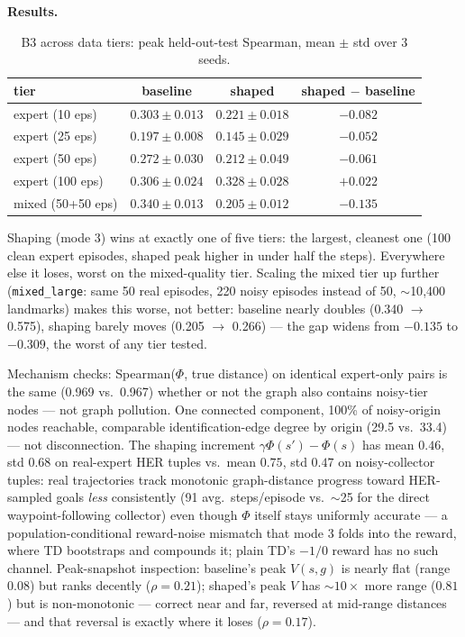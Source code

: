 \documentclass[11pt]{article}
\begin{document}
\textbf{Results.}

\begin{table}[h]
\centering
\caption{B3 across data tiers: peak held-out-test Spearman, mean $\pm$ std over 3 seeds.}
\begin{tabular}{lccc}
\toprule
tier & baseline & shaped & shaped $-$ baseline \\
\midrule
expert (10 eps)  & $0.303 \pm 0.013$ & $0.221 \pm 0.018$ & $-0.082$ \\
expert (25 eps)  & $0.197 \pm 0.008$ & $0.145 \pm 0.029$ & $-0.052$ \\
expert (50 eps)  & $0.272 \pm 0.030$ & $0.212 \pm 0.049$ & $-0.061$ \\
expert (100 eps) & $0.306 \pm 0.024$ & $\mathbf{0.328 \pm 0.028}$ & $\mathbf{+0.022}$ \\
mixed (50+50 eps) & $\mathbf{0.340 \pm 0.013}$ & $0.205 \pm 0.012$ & $-0.135$ \\
\bottomrule
\end{tabular}
\end{table}

Shaping (mode 3) wins at exactly one of five tiers: the largest, cleanest one (100 clean expert
episodes, shaped peak higher in under half the steps). Everywhere else it loses, worst on the
mixed-quality tier. Scaling the mixed tier up further (\texttt{mixed\_large}: same 50 real
episodes, 220 noisy episodes instead of 50, $\sim$10{,}400 landmarks) makes this worse, not
better: baseline nearly doubles (0.340 $\to$ 0.575), shaping barely moves (0.205 $\to$ 0.266) ---
the gap widens from $-0.135$ to $-0.309$, the worst of any tier tested.

Mechanism checks: Spearman($\Phi$, true distance) on identical expert-only pairs is the same
(0.969 vs.\ 0.967) whether or not the graph also contains noisy-tier nodes --- not graph
pollution. One connected component, 100\% of noisy-origin nodes reachable, comparable
identification-edge degree by origin (29.5 vs.\ 33.4) --- not disconnection. The shaping
increment $\gamma\Phi(s')-\Phi(s)$ has mean $0.46$, std $0.68$ on real-expert HER tuples vs.\
mean $0.75$, std $0.47$ on noisy-collector tuples: real trajectories track monotonic
graph-distance progress toward HER-sampled goals \emph{less} consistently (91 avg.\ steps/episode
vs.\ $\sim$25 for the direct waypoint-following collector) even though $\Phi$ itself stays
uniformly accurate --- a population-conditional reward-noise mismatch that mode 3 folds into the
reward, where TD bootstraps and compounds it; plain TD's $-1/0$ reward has no such channel.
Peak-snapshot inspection: baseline's peak $V(s,g)$ is nearly flat (range $0.08$) but ranks
decently ($\rho=0.21$); shaped's peak $V$ has $\sim\!10\times$ more range ($0.81$) but is
non-monotonic --- correct near and far, reversed at mid-range distances --- and that reversal is
exactly where it loses ($\rho=0.17$).
\end{document}
